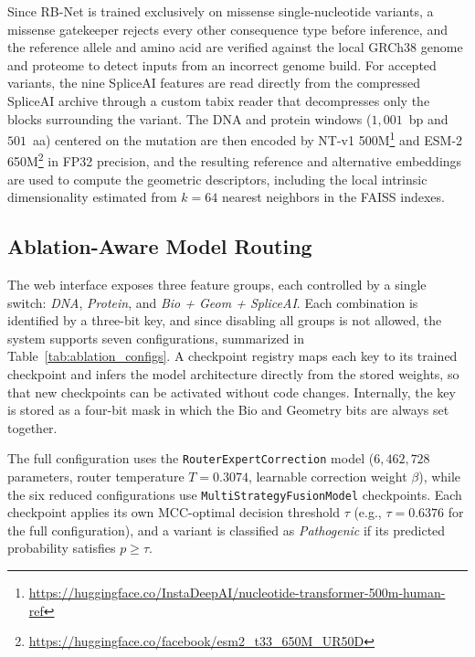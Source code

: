Since RB-Net is trained exclusively on missense single-nucleotide variants, a missense gatekeeper rejects every other consequence type before inference, and the reference allele and amino acid are verified against the local GRCh38 genome and proteome to detect inputs from an incorrect genome build. For accepted variants, the nine SpliceAI features are read directly from the compressed SpliceAI archive through a custom tabix reader that decompresses only the blocks surrounding the variant. The DNA and protein windows ($1{,}001$~bp and $501$~aa) centered on the mutation are then encoded by NT-v1 500M\footnote{\url{https://huggingface.co/InstaDeepAI/nucleotide-transformer-500m-human-ref}} and ESM-2 650M\footnote{\url{https://huggingface.co/facebook/esm2_t33_650M_UR50D}} in FP32 precision, and the resulting reference and alternative embeddings are used to compute the geometric descriptors, including the local intrinsic dimensionality estimated from $k = 64$ nearest neighbors in the FAISS indexes.

\subsection{Ablation-Aware Model Routing}

The web interface exposes three feature groups, each controlled by a single switch: \textit{DNA}, \textit{Protein}, and \textit{Bio + Geom + SpliceAI}. Each combination is identified by a three-bit key, and since disabling all groups is not allowed, the system supports seven configurations, summarized in Table~\ref{tab:ablation_configs}. A checkpoint registry maps each key to its trained checkpoint and infers the model architecture directly from the stored weights, so that new checkpoints can be activated without code changes. Internally, the key is stored as a four-bit mask in which the Bio and Geometry bits are always set together.

The full configuration uses the \texttt{RouterExpertCorrection} model ($6{,}462{,}728$ parameters, router temperature $T = 0.3074$, learnable correction weight $\beta$), while the six reduced configurations use \texttt{MultiStrategyFusionModel} checkpoints. Each checkpoint applies its own MCC-optimal decision threshold $\tau$ (e.g., $\tau = 0.6376$ for the full configuration), and a variant is classified as \textit{Pathogenic} if its predicted probability satisfies $p \geq \tau$.

